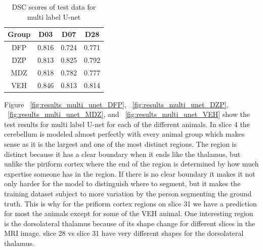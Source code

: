 \begin{table}[tbh]
\renewcommand{\arraystretch}{1}
\centering
\begin{tabular}{|c|c|c|c|}
\hline
\textbf{Group} & \textbf{D03}& \textbf{D07}& \textbf{D28}\\
\hline
DFP & 0.816 & 0.724 & 0.771\\      
\hline
DZP & 0.813 & 0.825 & 0.792\\
\hline
MDZ & 0.818 & 0.782 & 0.777\\ 
\hline
VEH & 0.846 & 0.813 & 0.814\\ 
\hline
\end{tabular}
\caption{DSC scores of test data for multi label U-net}
\label{tab.multi_model_results_unet}
\end{table}

Figure ~\ref{fig:results_multi_unet_DFP}, ~\ref{fig:results_multi_unet_DZP}, ~\ref{fig:results_multi_unet_MDZ}, and ~\ref{fig:results_multi_unet_VEH} show the test results for multi label U-net for each of the different animals.
In slice 4 the cerebellum is modeled almost perfectly with every animal group which makes sense as it is the largest and one of the most distinct regions. 
The region is distinct because it has a clear boundary when it ends like the thalamus, but unlike the piriform cortex where the end of the region is determined by how much expertise someone has in the region. 
If there is no clear boundary it makes it not only harder for the model to distinguish where to segment, but it makes the training dataset subject to more variation by the person segmenting the ground truth. 
This is why for the prifiorm cortex regions on slice 31 we have a prediction for most the animals except for some of the VEH animal. 
One interesting region is the dorsolateral thalamus because of its shape change for different slices in the MRI image. slice 28 vs slice 31 have very different shapes for the dorsolateral thalamus. 



